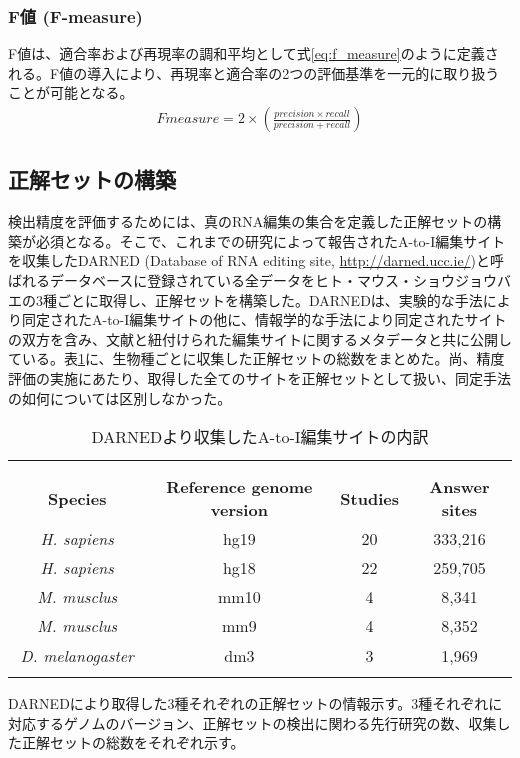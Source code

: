 \subsubsection{F値 (F-measure)}
F値は、適合率および再現率の調和平均として式\ref{eq:f_measure}のように定義される。F値の導入により、再現率と適合率の2つの評価基準を一元的に取り扱うことが可能となる。
\begin{eqnarray}
	Fmeasure = 2 \times \left( \frac{precision \times recall}{precision + recall} \right)
	\label{eq:f_measure}
\end{eqnarray}

\subsection{正解セットの構築}
検出精度を評価するためには、真のRNA編集の集合を定義した正解セットの構築が必須となる。そこで、これまでの研究によって報告されたA-to-I編集サイトを収集したDARNED (Database of RNA editing site, \url{http://darned.ucc.ie/})と呼ばれるデータベースに登録されている全データをヒト・マウス・ショウジョウバエの3種ごとに取得し、正解セットを構築した。DARNEDは、実験的な手法により同定されたA-to-I編集サイトの他に、情報学的な手法により同定されたサイトの双方を含み、文献と紐付けられた編集サイトに関するメタデータと共に公開している。表\ref{tab:darned}に、生物種ごとに収集した正解セットの総数をまとめた。尚、精度評価の実施にあたり、取得した全てのサイトを正解セットとして扱い、同定手法の如何については区別しなかった。

\begin{longtable}{cccc}
	\vspace{-0.5cm}
	\label{tab:darned}\\
	\caption{DARNEDより収集したA-to-I編集サイトの内訳}\\
	\cline{1-4}
	\textbf{Species} & \textbf{Reference genome version} & \textbf{Studies} & \textbf{Answer sites} \\
	\cline{1-4}
	\textit{H. sapiens} & hg19 & 20 & 333,216 \\
	\textit{H. sapiens} & hg18 & 22 & 259,705 \\
	\textit{M. musclus} & mm10 & 4 & 8,341 \\
	\textit{M. musclus} & mm9  & 4 & 8,352 \\
	\textit{D. melanogaster}　& dm3 & 3 & 1,969 \\
	\cline{1-4}
	\vspace{-0.8cm}
\end{longtable}
\begin{flushleft}
	\small{DARNEDにより取得した3種それぞれの正解セットの情報示す。3種それぞれに対応するゲノムのバージョン、正解セットの検出に関わる先行研究の数、収集した正解セットの総数をそれぞれ示す。}
\end{flushleft}

